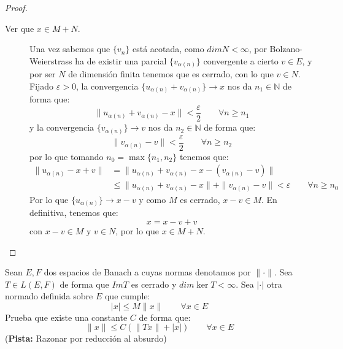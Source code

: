 \begin{ejercicio}
\begin{proof}
\begin{description}
            \item [Ver que $x\in M+N$.] Una vez sabemos que $\{v_n\}$ está acotada, como $dim N<\infty$, por Bolzano-Weierstrass ha de existir una parcial $\{v_{\alpha(n)}\}$ convergente a cierto $v\in E$, y por ser $N$ de dimensión finita tenemos que es cerrado, con lo que $v\in N$. Fijado $\varepsilon>0$, la convergencia $\{u_{\alpha(n)} + v_{\alpha(n)}\}\to x$ nos da $n_1\in \mathbb{N}$ de forma que:
                \begin{equation*}
                    \|u_{\alpha(n)} + v_{\alpha(n)} - x \| < \frac{\varepsilon}{2} \qquad \forall n\geq n_1
                \end{equation*}
                y la convergencia $\{v_{\alpha(n)}\}\to v$ nos da $n_2\in \mathbb{N}$ de forma que:
                \begin{equation*}
                    \|v_{\alpha(n)} - v\| < \frac{\varepsilon}{2}\qquad \forall n\geq n_2
                \end{equation*}
                por lo que tomando $n_0 = \max\{n_1,n_2\}$ tenemos que:
                \begin{align*}
                    \|u_{\alpha(n)} - x + v\| &= \|u_{\alpha(n)} + v_{\alpha(n)} - x - (v_{\alpha(n)} - v) \|\\ & \leq \|u_{\alpha(n)} + v_{\alpha(n)} - x\| + \|v_{\alpha(n)} - v\| < \varepsilon\qquad  \forall n\geq n_0
                \end{align*}
                Por lo que $\{u_{\alpha(n)}\}\to x-v$ y como $M$ es cerrado, $x-v\in M$. En definitiva, tenemos que:
                \begin{equation*}
                    x = x - v + v
                \end{equation*}
                con $x-v\in M$ y $v\in N$, por lo que $x\in M+N$.
        \end{description}
    \end{proof}
\end{ejercicio}

\begin{ejercicio}
\end{ejercicio}

\begin{ejercicio}
    Sean $E,F$ dos espacios de Banach a cuyas normas denotamos por $\|\cdot \|$. Sea $T\in L(E,F)$ de forma que $Im T$ es cerrado y $dim\ker T<\infty$. Sea $|\cdot |$ otra normado definida sobre $E$ que cumple:
    \begin{equation*}
        |x| \leq M \|x\|\qquad \forall x\in E
    \end{equation*}
    Prueba que existe una constante $C$ de forma que:
    \begin{equation*}
        \|x\| \leq C(\|Tx\| + |x|) \qquad \forall x\in E
    \end{equation*}
    (\textbf{Pista:} Razonar por reducción al absurdo)
\end{ejercicio}
